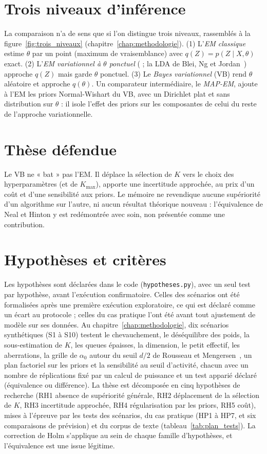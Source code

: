 \section*{Trois niveaux d'inférence}
La comparaison n'a de sens que si l'on distingue trois niveaux, rassemblés à la figure~\ref{fig:trois_niveaux} (chapitre~\ref{chap:methodologie}). (1) L'\emph{EM classique} estime $\theta$ par un point (maximum de vraisemblance) avec $q(Z) = p(Z \mid X, \theta)$ exact. (2) L'\emph{EM variationnel à $\theta$ ponctuel} (\cite{neal1998} ; la LDA de Blei, Ng et Jordan~\cite{blei2003}) approche $q(Z)$ mais garde $\theta$ ponctuel. (3) Le \emph{Bayes variationnel} (VB) rend $\theta$ aléatoire et approche $q(\theta)$. Un comparateur intermédiaire, le \emph{MAP-EM}, ajoute à l'EM les priors Normal-Wishart du VB, avec un Dirichlet plat et sans distribution sur $\theta$ : il isole l'effet des priors sur les composantes de celui du reste de l'approche variationnelle.

\section*{Thèse défendue}
Le VB ne « bat » pas l'EM. Il déplace la sélection de $K$ vers le choix des hyperparamètres (et de $K_{\max}$), apporte une incertitude approchée, au prix d'un coût et d'une sensibilité aux priors. Le mémoire ne revendique aucune supériorité d'un algorithme sur l'autre, ni aucun résultat théorique nouveau : l'équivalence de Neal et Hinton y est redémontrée avec soin, non présentée comme une contribution.

\section*{Hypothèses et critères}
Les hypothèses sont déclarées dans le code (\texttt{hypotheses.py}), avec un seul test par hypothèse, avant l'exécution confirmatoire. Celles des scénarios ont été formalisées après une première exécution exploratoire, ce qui est déclaré comme un écart au protocole ; celles du cas pratique l'ont été avant tout ajustement de modèle sur ses données. Au chapitre~\ref{chap:methodologie}, dix scénarios synthétiques (S1 à S10) testent le chevauchement, le déséquilibre des poids, la sous-estimation de $K$, les queues épaisses, la dimension, le petit effectif, les aberrations, la grille de $\alpha_0$ autour du seuil $d/2$ de Rousseau et Mengersen~\cite{rousseau2011}, un plan factoriel sur les priors et la sensibilité au seuil d'activité, chacun avec un nombre de réplications fixé par un calcul de puissance et un test apparié déclaré (équivalence ou différence). La thèse est décomposée en cinq hypothèses de recherche (RH1 absence de supériorité générale, RH2 déplacement de la sélection de $K$, RH3 incertitude approchée, RH4 régularisation par les priors, RH5 coût), mises à l'épreuve par les tests des scénarios, du cas pratique (HP1 à HP7, et six comparaisons de prévision) et du corpus de texte (tableau~\ref{tab:plan_tests}). La correction de Holm s'applique au sein de chaque famille d'hypothèses, et l'équivalence est une issue légitime.

